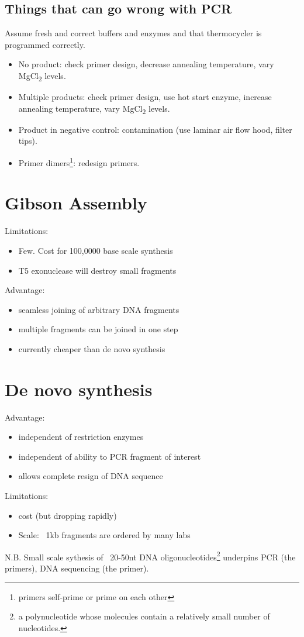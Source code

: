 \subsection{Things that can go wrong with PCR}
Assume fresh and correct buffers and enzymes and that thermocycler is programmed correctly.
\begin{itemize}
    \item No product: check primer design, decrease annealing temperature, vary MgCl\textsubscript{2} levels.
    \item Multiple products: check primer design, use hot start enzyme, increase annealing temperature, vary MgCl\textsubscript{2} levels.
    \item Product in negative control: contamination (use laminar air flow hood, filter tips).
    \item Primer dimers\footnote{primers self-prime or prime on each other}: redesign primers.
\end{itemize}

\section{Gibson Assembly}
Limitations:
\begin{itemize}
    \item Few. Cost for 100,0000 base scale synthesis
    \item T5 exonuclease will destroy small fragments
\end{itemize}
Advantage:
\begin{itemize}
    \item seamless joining of arbitrary DNA fragments
    \item multiple fragments can be joined in one step
    \item currently cheaper than de novo synthesis
\end{itemize}

\section{De novo synthesis}
Advantage:
\begin{itemize}
    \item independent of restriction enzymes
    \item independent of ability to PCR fragment of interest
    \item allows complete resign of DNA sequence
\end{itemize}
Limitations:
\begin{itemize}
    \item cost (but dropping rapidly)
    \item Scale: ~1kb fragments are ordered by many labs
\end{itemize}
N.B. Small scale sythesis of ~20-50nt DNA oligonucleotides\footnote{a polynucleotide whose molecules contain a relatively small number of nucleotides.} underpins PCR (the primers), DNA sequencing (the primer).